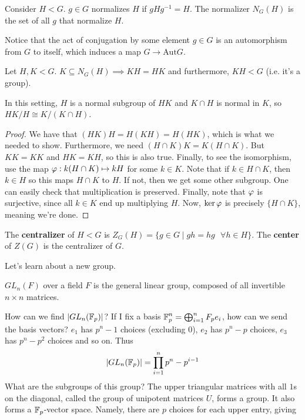 \begin{theorem}
    Consider $H < G$. $g \in G$ normalizes $H$ if $gHg^{-1} = H$. The normalizer $N_G(H)$ is the set of all $g$ that normalize $H$.
\end{theorem}
Notice that the act of conjugation by some element $g \in G$ is an automorphism from $G$ to itself,
which induces a map $G \to \text{Aut} G$.
\begin{theorem}
    Let $H, K < G$.
    $K \subseteq N_G(H) \implies KH = HK$
    and furthermore, $KH < G$ (i.e. it's a group).
\end{theorem}
\begin{theorem}
In this setting, $H$ is a normal subgroup of $HK$ and $K \cap H$ is normal in $K$, so $HK/H \cong K/(K\cap H)$.
\begin{proof}
    We have that $(HK)H = H(KH) = H(HK)$, which is what we needed to show.
    Furthermore, we need $(H\cap K)K = K(H \cap K)$. But $KK = KK$ and $HK = KH$, so this is also true.
    Finally, to see the isomorphism, use the map $\varphi: k(H \cap K) \mapsto k H$ for some $k \in K$.
    Note that if $k \in H \cap K$, then $k \in H$ so this maps $H \cap K$ to $H$. If not, then we get some other subgroup.
    One can easily check that multiplication is preserved. Finally, note that $\varphi$ is surjective, since all $k \in K$
    end up multiplying $H$.
    Now, $\ker \varphi$ is precisely $\{H \cap K\}$, meaning we're done.
\end{proof}
\end{theorem}
\begin{definition}
    The \textbf{centralizer} of $H < G$ is $Z_G(H) = \{g \in G \mid gh = hg \text{ } \forall h \in H\}$.
    The \textbf{center} of $Z(G)$ is the centralizer of $G$.
\end{definition}
Let's learn about a new group.
\begin{definition}
    $GL_n(F)$ over a field $F$ is the general linear group, composed of all invertible $n \times n$ matrices.
\end{definition}
How can we find $|GL_n(\operatorname{\mathbb{F}}_p)|$? If I fix a basis $\operatorname{\mathbb{F}}_p^n = \bigoplus_{i = 1}^n F_p e_i$,
how can we send the basis vectors? $e_1$ has $p^n - 1$ choices (excluding $0$), $e_2$ has $p^n - p$ choices,
$e_3$ has $p^n - p^2$ choices and so on. Thus
\[ |GL_n(\operatorname{\mathbb{F}}_p)| = \prod_{i = 1}^n p^n - p^{i - 1} \]
What are the subgroups of this group? The upper triangular matrices with all $1$s on the diagonal, called the
group of unipotent matrices $U$, forms a group. It also forms a $\operatorname{\mathbb{F}}_p$-vector space. Namely, there
are $p$ choices for each upper entry, giving
